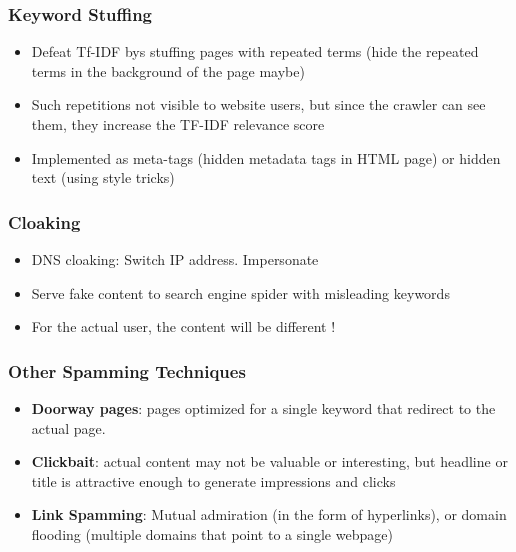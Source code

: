 \documentclass{article}
\begin{document}
\subsubsection{Keyword Stuffing}
\begin{itemize}
    \item Defeat Tf-IDF bys stuffing pages with repeated terms (hide the repeated terms in the background of the page maybe)
    
    \item Such repetitions not visible to website users, but since the crawler can see them, they increase the TF-IDF relevance score
    
    \item Implemented as meta-tags (hidden metadata tags in HTML page) or hidden text (using style tricks)
\end{itemize}

\subsubsection{Cloaking}
\begin{itemize}
    \item DNS cloaking: Switch IP address. Impersonate
    
    \item Serve fake content to search engine spider with misleading keywords
    
    \item For the actual user, the content will be different !
\end{itemize}

\subsubsection{Other Spamming Techniques}
\begin{itemize}
    \item \textbf{Doorway pages}: pages optimized for a single keyword that redirect to the actual page. 
    
    \item \textbf{Clickbait}: actual content may not be valuable or interesting, but headline or title is attractive enough to generate impressions and clicks
    
    \item \textbf{Link Spamming}: Mutual admiration (in the form of hyperlinks), or domain flooding (multiple domains that point to a single webpage)
\end{itemize}
\end{document}
